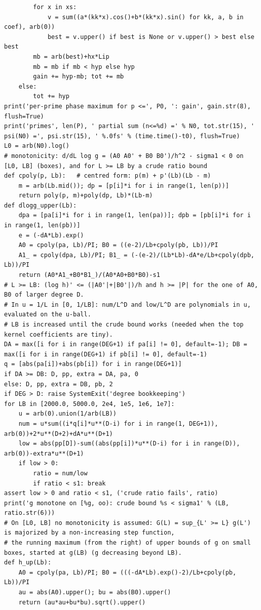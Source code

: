 \documentclass[11pt,reqno]{amsart}
\numberwithin{equation}{section}
\theoremstyle{definition}
\theoremstyle{remark}
\begin{document}
\begin{lstlisting}
        for x in xs:
            v = sum((a*(kk*x).cos()+b*(kk*x).sin() for kk, a, b in coef), arb(0))
            best = v.upper() if best is None or v.upper() > best else best
        mb = arb(best)+hx*Lip
        mb = mb if mb < hyp else hyp
        gain += hyp-mb; tot += mb
    else:
        tot += hyp
print('per-prime phase maximum for p <=', P0, ': gain', gain.str(8), flush=True)
print('primes', len(P), ' partial sum (n<=%d) =' % N0, tot.str(15), ' psi(N0) =', psi.str(15), ' %.0fs' % (time.time()-t0), flush=True)
L0 = arb(N0).log()
# monotonicity: d/dL log g = (A0 A0' + B0 B0')/h^2 - sigma1 < 0 on [L0, LB] (boxes), and for L >= LB by a crude ratio bound
def cpoly(p, Lb):   # centred form: p(m) + p'(Lb)(Lb - m)
    m = arb(Lb.mid()); dp = [p[i]*i for i in range(1, len(p))]
    return poly(p, m)+poly(dp, Lb)*(Lb-m)
def dlogg_upper(Lb):
    dpa = [pa[i]*i for i in range(1, len(pa))]; dpb = [pb[i]*i for i in range(1, len(pb))]
    e = (-dA*Lb).exp()
    A0 = cpoly(pa, Lb)/PI; B0 = ((e-2)/Lb+cpoly(pb, Lb))/PI
    A1_ = cpoly(dpa, Lb)/PI; B1_ = (-(e-2)/(Lb*Lb)-dA*e/Lb+cpoly(dpb, Lb))/PI
    return (A0*A1_+B0*B1_)/(A0*A0+B0*B0)-s1
# L >= LB: (log h)' <= (|A0'|+|B0'|)/h and h >= |P| for the one of A0, B0 of larger degree D.
# In u = 1/L in [0, 1/LB]: num/L^D and low/L^D are polynomials in u, evaluated on the u-ball.
# LB is increased until the crude bound works (needed when the top kernel coefficients are tiny).
DA = max([i for i in range(DEG+1) if pa[i] != 0], default=-1); DB = max([i for i in range(DEG+1) if pb[i] != 0], default=-1)
q = [abs(pa[i])+abs(pb[i]) for i in range(DEG+1)]
if DA >= DB: D, pp, extra = DA, pa, 0
else: D, pp, extra = DB, pb, 2
if DEG > D: raise SystemExit('degree bookkeeping')
for LB in [2000.0, 5000.0, 2e4, 1e5, 1e6, 1e7]:
    u = arb(0).union(1/arb(LB))
    num = u*sum((i*q[i]*u**(D-i) for i in range(1, DEG+1)), arb(0))+2*u**(D+2)+dA*u**(D+1)
    low = abs(pp[D])-sum((abs(pp[i])*u**(D-i) for i in range(D)), arb(0))-extra*u**(D+1)
    if low > 0:
        ratio = num/low
        if ratio < s1: break
assert low > 0 and ratio < s1, ('crude ratio fails', ratio)
print('g monotone on [%g, oo): crude bound %s < sigma1' % (LB, ratio.str(6)))
# On [L0, LB] no monotonicity is assumed: G(L) = sup_{L' >= L} g(L') is majorized by a non-increasing step function,
# the running maximum (from the right) of upper bounds of g on small boxes, started at g(LB) (g decreasing beyond LB).
def h_up(Lb):
    A0 = cpoly(pa, Lb)/PI; B0 = (((-dA*Lb).exp()-2)/Lb+cpoly(pb, Lb))/PI
    au = abs(A0).upper(); bu = abs(B0).upper()
    return (au*au+bu*bu).sqrt().upper()

\end{lstlisting}
\end{document}
